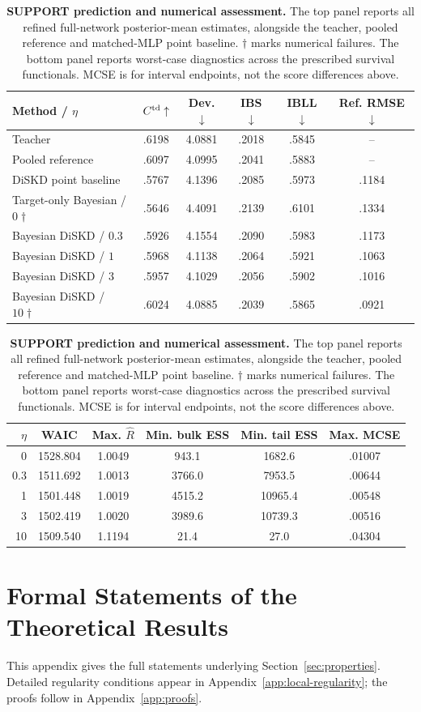 \documentclass{article} %
\begin{document}
\begin{table}[htbp]
\centering\footnotesize
\caption{\textbf{SUPPORT prediction and numerical assessment.} The top panel reports all refined full-network posterior-mean estimates, alongside the teacher, pooled reference and matched-MLP point baseline. $\dagger$ marks numerical failures. The bottom panel reports worst-case diagnostics across the prescribed survival functionals. MCSE is for interval endpoints, not the score differences above.}
\label{tab:real-support}
\setlength{\tabcolsep}{4pt}
\begin{tabular}{@{}lccccc@{}}
\toprule
Method / $\eta$ & $C^{\rm td}\uparrow$ & Dev. $\downarrow$ & IBS $\downarrow$ & IBLL $\downarrow$ & Ref. RMSE $\downarrow$\\
\midrule
Teacher & .6198 & 4.0881 & .2018 & .5845 & --\\
Pooled reference & .6097 & 4.0995 & .2041 & .5883 & --\\
DiSKD point baseline & .5767 & 4.1396 & .2085 & .5973 & .1184\\
Target-only Bayesian / $0\dagger$ & .5646 & 4.4091 & .2139 & .6101 & .1334\\
Bayesian DiSKD / $0.3$ & .5926 & 4.1554 & .2090 & .5983 & .1173\\
Bayesian DiSKD / $1$ & .5968 & 4.1138 & .2064 & .5921 & .1063\\
Bayesian DiSKD / $3$ & .5957 & 4.1029 & .2056 & .5902 & .1016\\
Bayesian DiSKD / $10\dagger$ & .6024 & 4.0885 & .2039 & .5865 & .0921\\
\bottomrule
\end{tabular}
\par\medskip
\begin{tabular}{@{}rccccc@{}}
\toprule
$\eta$ & WAIC & Max. $\widehat R$ & Min. bulk ESS & Min. tail ESS & Max. MCSE\\
\midrule
0 & 1528.804 & 1.0049 & 943.1 & 1682.6 & .01007\\
0.3 & 1511.692 & 1.0013 & 3766.0 & 7953.5 & .00644\\
1 & 1501.448 & 1.0019 & 4515.2 & 10965.4 & .00548\\
3 & 1502.419 & 1.0020 & 3989.6 & 10739.3 & .00516\\
10 & 1509.540 & 1.1194 & 21.4 & 27.0 & .04304\\
\bottomrule
\end{tabular}
\end{table}

\section{Formal Statements of the Theoretical Results}
\label{app:formal-results}
This appendix gives the full statements underlying Section~\ref{sec:properties}. Detailed regularity conditions appear in Appendix~\ref{app:local-regularity}; the proofs follow in Appendix~\ref{app:proofs}.
\end{document}
